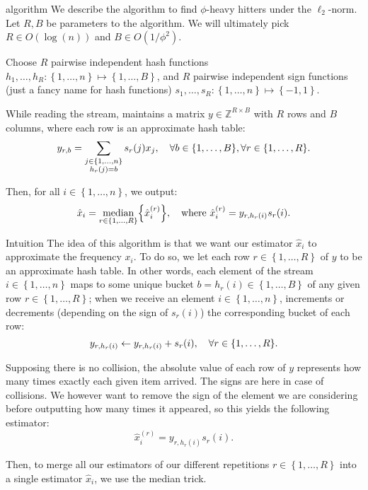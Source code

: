 \documentclass[a4paper]{article}
\begin{document}
\begin{parag}{ algorithm}
    We describe the  algorithm to find $\phi$-heavy hitters under the $\ell_2$-norm. Let $R, B$ be parameters to the algorithm. We will ultimately pick $R \in O\left(\log\left(n\right)\right)$ and $B \in O\left(1/\phi^2\right)$.

    Choose $R$ pairwise independent hash functions $h_1, \ldots, h_R: \left\{1, \ldots, n\right\} \mapsto \left\{1, \ldots, B\right\}$, and $R$ pairwise independent sign functions (just a fancy name for hash functions) $s_1, \ldots, s_R: \left\{1, \ldots, n\right\} \mapsto \left\{-1, 1\right\}$.

    While reading the stream,  maintains a matrix $y \in \mathbb{Z}^{R \times B}$ with $R$ rows and $B$ columns, where each row is an approximate hash table:
    \[y_{r, b} = \sum_{\substack{j \in \left\{1, \ldots, n\right\} \\ h_r\left(j\right) = b}} s_r\left(j\right) x_j, \mathspace \forall b \in \left\{1, \ldots, B\right\}, \forall r \in \left\{1, \ldots, R\right\}.\]

    Then, for all $i \in \left\{1, \ldots, n\right\}$, we output:
    \[\hat{x}_i = \median_{r \in \left\{1, \ldots, R\right\}} \left\{\hat{x}_i^{\left(r\right)}\right\}, \mathspace \text{where }\hat{x}_i^{\left(r\right)} = y_{r, h_r\left(i\right)} s_r\left(i\right).\] 

    \begin{subparag}{Intuition}
        The idea of this algorithm is that we want our estimator $\hat{x}_i$ to approximate the frequency $x_i$. To do so, we let each row $r \in \left\{1, \ldots, R\right\}$ of $y$ to be an approximate hash table. In other words, each element of the stream $i \in \left\{1, \ldots, n\right\}$ maps to some unique bucket $b = h_r\left(i\right) \in \left\{1, \ldots, B\right\}$ of any given row $r \in \left\{1, \ldots, R\right\}$; when we receive an element $i \in \left\{1, \ldots, n\right\}$,  increments or decrements (depending on the sign of $s_r\left(i\right)$) the corresponding bucket of each row:
        \[y_{r, h_r\left(i\right)} \leftarrow y_{r, h_r\left(i\right)} + s_r\left(i\right), \mathspace \forall r \in \left\{1, \ldots, R\right\}.\]

        Supposing there is no collision, the absolute value of each row of $y$ represents how many times exactly each given item arrived. The signs are here in case of collisions. We however want to remove the sign of the element we are considering before outputting how many times it appeared, so this yields the following estimator:
        \[\hat{x}_i^{\left(r\right)} = y_{r, h_r\left(i\right)} s_r\left(i\right).\]

        Then, to merge all our estimators of our different repetitions $r \in \left\{1, \ldots, R\right\}$ into a single estimator $\hat{x}_i$, we use the median trick.
    \end{subparag}
\end{parag}
\end{document}
